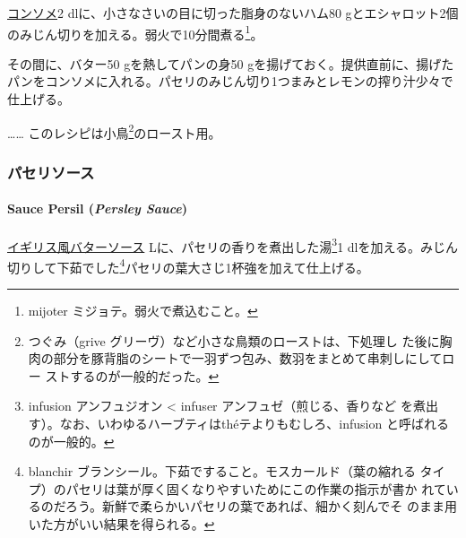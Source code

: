 \begin{recette}

\protect\hyperlink{}{コンソメ}2
dlに、小さなさいの目に切った脂身のないハム80
gとエシャロット2個のみじん切りを加える。弱火で10分間煮る\footnote{mijoter
  ミジョテ。弱火で煮込むこと。}。

その間に、バター50 gを熱してパンの身50
gを揚げておく。提供直前に、揚げたパンをコンソメに入れる。パセリのみじん切り1つまみとレモンの搾り汁少々で仕上げる。

\ldots{}\ldots{} このレシピは小鳥\footnote{つぐみ（grive
  グリーヴ）など小さな鳥類のローストは、下処理し
  た後に胸肉の部分を豚背脂のシートで一羽ずつ包み、数羽をまとめて串刺しにしてロー
  ストするのが一般的だった。}のロースト用。

\maeaki

\hypertarget{ux30d1ux30bbux30eaux30bdux30fcux30b9}{%
\subsubsection{パセリソース}\label{ux30d1ux30bbux30eaux30bdux30fcux30b9}}

\hypertarget{perseley-sauce}{%
\paragraph{\texorpdfstring{Sauce Persil (\emph{Persley
Sauce})}{Sauce Persil (Persley Sauce)}}\label{perseley-sauce}}


\protect\hyperlink{bread-sauce}{イギリス風バターソース}\undemi{}
Lに、パセリの香りを煮出した湯\footnote{infusion アンフュジオン
  \textless{} infuser アンフュゼ（煎じる、香りなど
  を煮出す）。なお、いわゆるハーブティはthéテよりもむしろ、infusion
  と呼ばれるのが一般的。}1
dlを加える。みじん切りして下茹でした\footnote{blanchir
  ブランシール。下茹ですること。モスカールド（葉の縮れる
  タイプ）のパセリは葉が厚く固くなりやすいためにこの作業の指示が書か
  れているのだろう。新鮮で柔らかいパセリの葉であれば、細かく刻んでそ
  のまま用いた方がいい結果を得られる。}パセリの葉大さじ1杯強を加えて仕上げる。


\end{recette}
